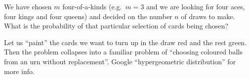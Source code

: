 \documentclass[6pt]{article}
\begin{document}
\clearpage
\begin{tcolorbox}[title=\text{Hypergeometric \ding{173}}]
We have chosen $m$ four-of-a-kinds (e.g.\ $m=3$ and we are looking for four aces, four kings and four queens) and decided on the number $n$ of draws to make. What is the probability of that particular selection of cards being chosen?

Let us ``paint'' the cards we want to turn up in the draw red and the rest green. Then the problem collapses into a familiar problem of ``choosing coloured balls from an urn without replacement''. Google ``hypergeometric distribution'' for more info.
\end{tcolorbox}
\end{document}
